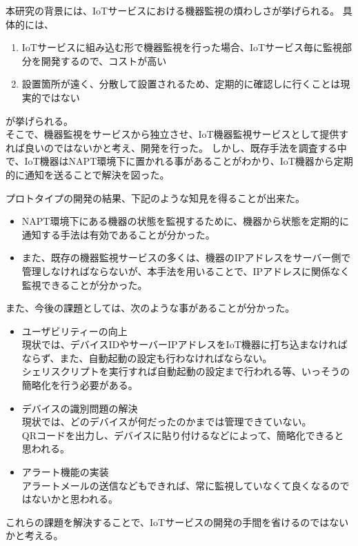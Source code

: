 本研究の背景には、IoTサービスにおける機器監視の煩わしさが挙げられる。
具体的には、
\begin{enumerate}
	\item IoTサービスに組み込む形で機器監視を行った場合、IoTサービス毎に監視部分を開発するので、コストが高い
	\item 設置箇所が遠く、分散して設置されるため、定期的に確認しに行くことは現実的ではない
\end{enumerate}
が挙げられる。\\

そこで、機器監視をサービスから独立させ、IoT機器監視サービスとして提供すれば良いのではないかと考え、開発を行った。
しかし、既存手法を調査する中で、IoT機器はNAPT環境下に置かれる事があることがわかり、IoT機器から定期的に通知を送ることで解決を図った。

プロトタイプの開発の結果、下記のような知見を得ることが出来た。
\begin{itemize}
	\item NAPT環境下にある機器の状態を監視するために、機器から状態を定期的に通知する手法は有効であることが分かった。
	\item また、既存の機器監視サービスの多くは、機器のIPアドレスをサーバー側で管理しなければならないが、本手法を用いることで、IPアドレスに関係なく監視できることが分かった。
\end{itemize}

また、今後の課題としては、次のような事があることが分かった。
\begin{itemize}
	\item ユーザビリティーの向上\\
		現状では、デバイスIDやサーバーIPアドレスをIoT機器に打ち込まなければならず、また、自動起動の設定も行わなければならない。\\
		シェリスクリプトを実行すれば自動起動の設定まで行われる等、いっそうの簡略化を行う必要がある。
	\item デバイスの識別問題の解決\\
		現状では、どのデバイスが何だったのかまでは管理できていない。\\
		QRコードを出力し、デバイスに貼り付けるなどによって、簡略化できると思われる。
	\item アラート機能の実装\\
		アラートメールの送信などもできれば、常に監視していなくて良くなるのではないかと思われる。
\end{itemize}
これらの課題を解決することで、IoTサービスの開発の手間を省けるのではないかと考える。


